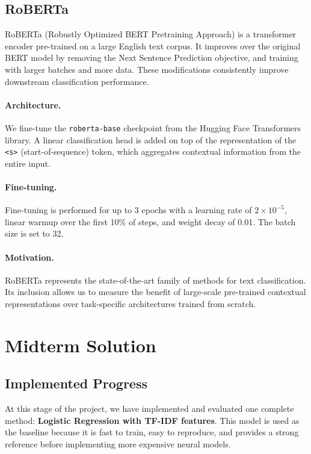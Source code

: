 \documentclass{article}
\begin{document}
\subsection{RoBERTa}

RoBERTa (Robustly Optimized BERT Pretraining Approach) 
is a transformer encoder pre-trained on a large
English text corpus.
It improves over the original BERT model by removing
the Next Sentence Prediction objective, and training with larger batches and 
more data. These modifications consistently improve downstream classification 
performance.

\paragraph{Architecture.}
We fine-tune the \texttt{roberta-base} checkpoint 
from the Hugging Face Transformers library.
A linear classification head is added on top of the representation of the
\texttt{<s>} (start-of-sequence) token, which aggregates contextual information
from the entire input.

\paragraph{Fine-tuning.}
Fine-tuning is performed for up to 3 epochs with a learning rate of
$2 \times 10^{-5}$, linear warmup over the first 10\% of steps, and weight
decay of 0.01.
The batch size is set to 32.

\paragraph{Motivation.}
RoBERTa represents the state-of-the-art family of methods for text
classification.
Its inclusion allows us to measure the benefit of large-scale pre-trained
contextual representations over task-specific architectures trained from
scratch.

\section{Midterm Solution}

\subsection{Implemented Progress}
At this stage of the project, we have implemented and evaluated one complete
method: \textbf{Logistic Regression with TF-IDF features}. This model is used as
the baseline because it is fast to train, easy to reproduce, and provides a
strong reference before implementing more expensive neural models.
\end{document}
